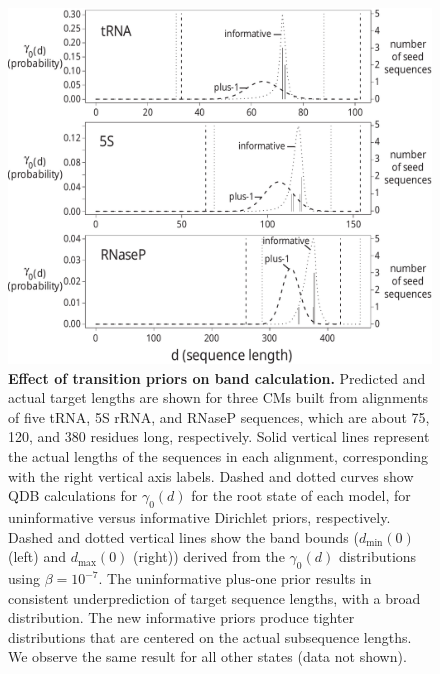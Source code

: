 \begin{figure}
  \begin{center}
    \includegraphics[width=6in,angle=0]{figs/3fam_bands}
    \caption{\textbf{Effect of transition priors on band calculation.}
      Predicted and actual target lengths are shown for three CMs
      built from alignments of five tRNA, 5S rRNA, and RNaseP
      sequences, which are about 75, 120, and 380 residues long,
      respectively.  Solid vertical lines represent the actual lengths
      of the sequences in each alignment, corresponding with the right
      vertical axis labels. Dashed and dotted curves show QDB
      calculations for $\gamma_0(d)$ for the root state of each model,
      for uninformative versus informative Dirichlet priors,
      respectively.  Dashed and dotted vertical lines show the band
      bounds ($d_{\mbox{min}}(0)$ (left) and $d_{\mbox{max}}(0)$
      (right)) derived from the $\gamma_0(d)$ distributions using
      $\beta = 10^{-7}$. The uninformative plus-one prior results in
      consistent underprediction of target sequence lengths, with a
      broad distribution. The new informative priors produce tighter
      distributions that are centered on the actual subsequence
      lengths. We observe the same result for all other states
      (data not shown).}
    \label{fig:bands}
  \end{center}
\end{figure}
